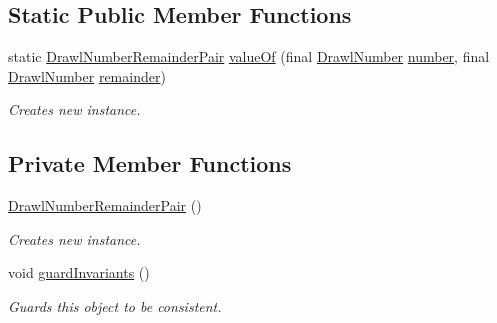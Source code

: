 \subsection*{Static Public Member Functions}
\begin{DoxyCompactItemize}
\item 
static \hyperlink{classcom_1_1aarrelaakso_1_1drawl_1_1_drawl_number_remainder_pair}{Drawl\+Number\+Remainder\+Pair} \hyperlink{classcom_1_1aarrelaakso_1_1drawl_1_1_drawl_number_remainder_pair_af5db5411a5733a9e2c98aa1e8e88765f}{value\+Of} (final \hyperlink{classcom_1_1aarrelaakso_1_1drawl_1_1_drawl_number}{Drawl\+Number} \hyperlink{classcom_1_1aarrelaakso_1_1drawl_1_1_drawl_number_remainder_pair_a8c62602c155e6b1fe737605fe7229b36}{number}, final \hyperlink{classcom_1_1aarrelaakso_1_1drawl_1_1_drawl_number}{Drawl\+Number} \hyperlink{classcom_1_1aarrelaakso_1_1drawl_1_1_drawl_number_remainder_pair_a95c7e55169d65822bbceb08ff2f800dc}{remainder})
\begin{DoxyCompactList}\small\item\em Creates new instance. \end{DoxyCompactList}\end{DoxyCompactItemize}
\subsection*{Private Member Functions}
\begin{DoxyCompactItemize}
\item 
\hyperlink{classcom_1_1aarrelaakso_1_1drawl_1_1_drawl_number_remainder_pair_aac59fe33b4a1888d48ba7bf4bc0ebaa4}{Drawl\+Number\+Remainder\+Pair} ()
\begin{DoxyCompactList}\small\item\em Creates new instance. \end{DoxyCompactList}\item 
void \hyperlink{classcom_1_1aarrelaakso_1_1drawl_1_1_drawl_number_remainder_pair_ae5c688bbfb072f385c338ab16f34c7a8}{guard\+Invariants} ()
\begin{DoxyCompactList}\small\item\em Guards this object to be consistent. \end{DoxyCompactList}\end{DoxyCompactItemize}
